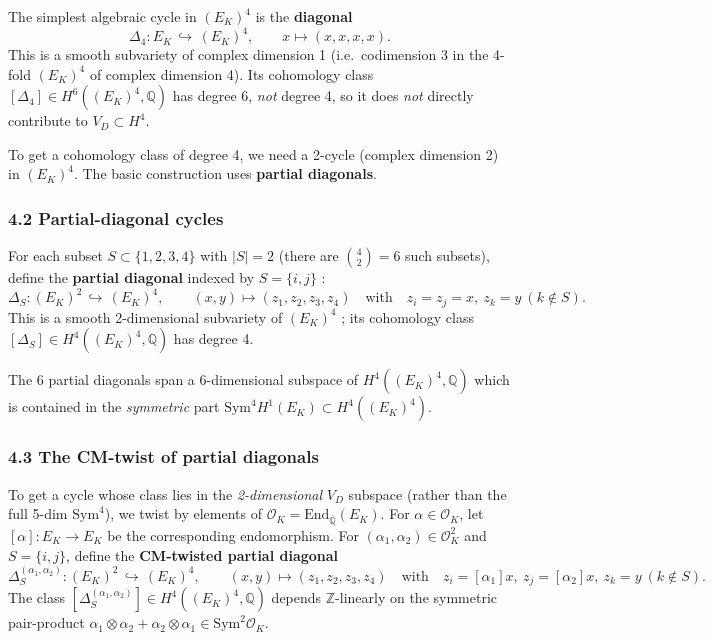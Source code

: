 \documentclass[
  11pt,
  a4paper,
]{article}
\begin{document}
The simplest algebraic cycle in \((E_K)^4\) is the \textbf{diagonal}
\[
\Delta_4 : E_K \,\hookrightarrow\, (E_K)^4, \qquad x \mapsto (x, x, x, x).
\]
This is a smooth subvariety of complex dimension 1 (i.e.~codimension 3 in the 4-fold \((E_K)^4\) of complex dimension 4). Its cohomology class \([\Delta_4] \in H^6((E_K)^4, \mathbb{Q})\) has degree 6, \emph{not} degree 4, so it does \emph{not} directly contribute to \(V_D \subset H^4\).

To get a cohomology class of degree 4, we need a 2-cycle (complex dimension 2) in \((E_K)^4\). The basic construction uses \textbf{partial diagonals}.

\hypertarget{partial-diagonal-cycles}{%
\subsubsection{4.2 Partial-diagonal cycles}\label{partial-diagonal-cycles}}

For each subset \(S \subset \{1, 2, 3, 4\}\) with \(|S| = 2\) (there are \(\binom{4}{2} = 6\) such subsets), define the \textbf{partial diagonal} indexed by \(S = \{i, j\}\) :
\[
\Delta_S : (E_K)^2 \,\hookrightarrow\, (E_K)^4, \qquad (x, y) \mapsto (z_1, z_2, z_3, z_4)\quad\text{with}\quad z_i = z_j = x,\ z_k = y\ (k \notin S).
\]
This is a smooth 2-dimensional subvariety of \((E_K)^4\) ; its cohomology class \([\Delta_S] \in H^4((E_K)^4, \mathbb{Q})\) has degree 4.

The 6 partial diagonals span a 6-dimensional subspace of \(H^4((E_K)^4, \mathbb{Q})\) which is contained in the \emph{symmetric} part \(\mathrm{Sym}^4 H^1(E_K) \subset H^4((E_K)^4)\).

\hypertarget{the-cm-twist-of-partial-diagonals}{%
\subsubsection{4.3 The CM-twist of partial diagonals}\label{the-cm-twist-of-partial-diagonals}}

To get a cycle whose class lies in the \emph{2-dimensional} \(V_D\) subspace (rather than the full 5-dim \(\mathrm{Sym}^4\)), we twist by elements of \(\mathcal{O}_K = \mathrm{End}_{\overline{\mathbb{Q}}}(E_K)\). For \(\alpha \in \mathcal{O}_K\), let \([\alpha] : E_K \to E_K\) be the corresponding endomorphism. For \((\alpha_1, \alpha_2) \in \mathcal{O}_K^2\) and \(S = \{i, j\}\), define the \textbf{CM-twisted partial diagonal}
\[
\Delta_S^{(\alpha_1, \alpha_2)} : (E_K)^2 \,\hookrightarrow\, (E_K)^4, \qquad (x, y) \mapsto (z_1, z_2, z_3, z_4)\quad\text{with}\quad z_i = [\alpha_1] x,\ z_j = [\alpha_2] x,\ z_k = y\ (k \notin S).
\]
The class \([\Delta_S^{(\alpha_1, \alpha_2)}] \in H^4((E_K)^4, \mathbb{Q})\) depends \(\mathbb{Z}\)-linearly on the symmetric pair-product \(\alpha_1 \otimes \alpha_2 + \alpha_2 \otimes \alpha_1 \in \mathrm{Sym}^2 \mathcal{O}_K\).
\end{document}
